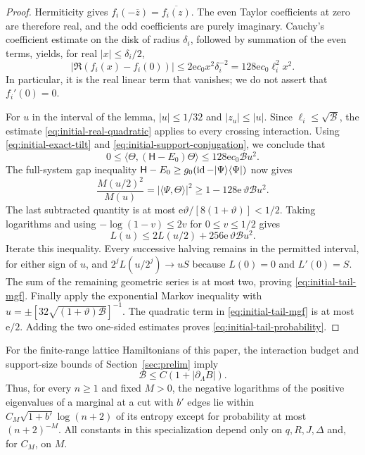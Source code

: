 \begin{proof}
Hermiticity gives
$f_i(-\overline z)=\overline{f_i(z)}$.  The even Taylor coefficients
at zero are therefore real, and the odd coefficients are purely
imaginary.  Cauchy's coefficient estimate on the disk of radius
$\delta_i$, followed by summation of the even terms, yields, for real
$|x|\le\delta_i/2$,
\begin{equation}
 \bigl|\Re(f_i(x)-f_i(0))\bigr|
 \le2\mathrm e c_0x^2\delta_i^{-2}
 =128\mathrm e c_0\ell_i^2x^2.
 \label{eq:initial-real-quadratic}
\end{equation}
In particular, it is the real linear term that vanishes; we do not
assert that $f_i'(0)=0$.

For $u$ in the interval of the lemma, $|u|\le1/32$ and
$|z_u|\le|u|$.  Since $\ell_i\le\sqrt{\mathcal B}$, the estimate
\eqref{eq:initial-real-quadratic} applies to every crossing interaction.
Using \eqref{eq:initial-exact-tilt} and
\eqref{eq:initial-support-conjugation}, we conclude that
\begin{equation}
 0\le\langle\Theta,(\mathsf H-E_0)\Theta\rangle
 \le128\mathrm e c_0\mathcal B u^2.
 \label{eq:initial-tilted-energy}
\end{equation}
The full-system gap inequality
$\mathsf H-E_0\ge g_0(\operatorname{id}-\lvert \Psi\rangle\langle \Psi\rvert)$ now gives
\[
 \frac{M(u/2)^2}{M(u)}
 =|\langle\Psi,\Theta\rangle|^2
 \ge1-128\mathrm e\,\vartheta\mathcal B u^2.
\]
The last subtracted quantity is at most
$\mathrm e\vartheta/[8(1+\vartheta)]<1/2$.  Taking logarithms and
using $-\log(1-v)\le2v$ for $0\le v\le1/2$ gives
\[
 L(u)\le2L(u/2)+256\mathrm e\,\vartheta\mathcal B u^2.
\]
Iterate this inequality.  Every successive halving remains in the
permitted interval, for either sign of $u$, and
$2^jL(u/2^j)\to uS$ because $L(0)=0$ and $L'(0)=S$.
The sum of the remaining geometric series is at most two, proving
\eqref{eq:initial-tail-mgf}.  Finally apply the exponential Markov
inequality with
$u=\pm[32\sqrt{(1+\vartheta)\mathcal B}]^{-1}$.
The quadratic term in \eqref{eq:initial-tail-mgf} is at most
$\mathrm e/2$.  Adding the two one-sided estimates proves
\eqref{eq:initial-tail-probability}.
\end{proof}

For the finite-range lattice Hamiltonians of this paper, the interaction
budget and support-size bounds of Section~\ref{sec:prelim} imply
\begin{equation}
 \mathcal B\le C(1+|\partial_\Lambda B|).
 \label{eq:initial-local-tail-parameter}
\end{equation}
Thus, for every $n\ge1$ and fixed $M>0$, the negative logarithms of the
positive eigenvalues of a marginal at a cut with $b'$ edges lie within
$C_M\sqrt{1+b'}\log(n+2)$ of its entropy except for probability
at most $(n+2)^{-M}$.  All constants in this
specialization depend only on $q,R,J,\Delta$ and, for $C_M$, on $M$.

